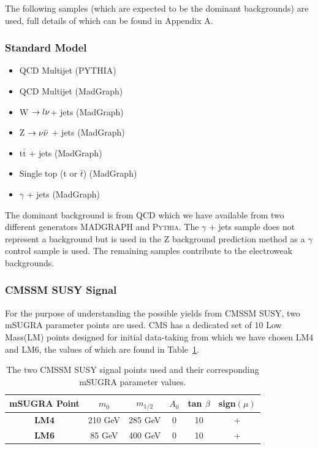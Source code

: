 The following samples (which are expected to be the dominant backgrounds) are used, full details of which can be found in Appendix A. 

\subsubsection{Standard Model}
\begin{itemize}
\item QCD Multijet (\textsc{PYTHIA})
\item QCD Multijet (MadGraph)
\item W $\rightarrow l\nu$+ jets (MadGraph)
\item Z $\rightarrow \nu\bar{\nu}$ + jets (MadGraph)
\item t$\bar{\textrm{t}}$ + jets (MadGraph)
\item Single top (t or $\bar{t}$)  (MadGraph)
\item $\gamma$ + jets (MadGraph)
\end{itemize}

The dominant background is from QCD which we have available from two different generators \textsc{MADGRAPH} and \textsc{Pythia}. The $\gamma$ + jets sample does not represent a background but is used in the Z background prediction method as a $\gamma$ control sample is used. The remaining samples contribute to the electroweak backgrounds. 

\subsubsection{CMSSM SUSY Signal}
For the purpose of understanding the possible yields from CMSSM SUSY, two mSUGRA parameter points are used. CMS has a dedicated set of 10 Low Mass(LM) points designed for initial data-taking from which we have chosen LM4 and LM6, the values of which are found in Table~\ref{tab:LM}.

\begin{table}[htbp]
\centering
\begin{tabular}{c c c c c c }
\hline
\hline
\textbf{mSUGRA Point} & $m_{0}$ & $m_{1/2}$ & $A_{0}$ & tan $\beta$ & sign$(\mu) $ \\
\hline
\hline
\textbf{LM4} & 210 GeV & 285 GeV & 0 & 10 & + \\
\textbf{LM6} & 85 GeV & 400 GeV & 0 & 10 & +\\
\hline
\end{tabular}
\caption{\label{tab:LM}The two CMSSM SUSY signal points used and their corresponding mSUGRA parameter values.}
\end{table}

